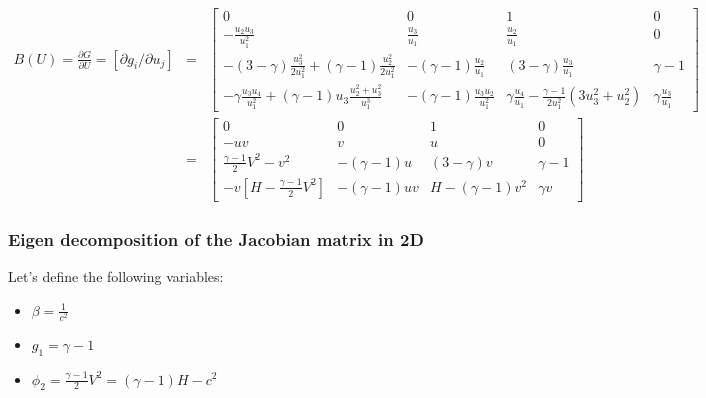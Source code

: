 \documentclass{article}
\begin{document}
\begin{eqnarray}
  B(U) = \frac{\partial G}{\partial U} = \left[ \partial g_i/\partial u_j \right] & = & \left[
    \begin{array}{cccc}
      0 & 0 & 1 & 0\\
      -\frac{u_2 u_3}{u_1^2} & \frac{u_3}{u_1} & \frac{u_2}{u_1} & 0\\
      -(3-\gamma)\frac{u_3^2}{2 u_1^2} + (\gamma-1)\frac{u_2^2}{2 u_1^2} & -(\gamma-1)\frac{u_2}{u_1} & (3-\gamma) \frac{u_3}{u_1} & \gamma-1\\
       -\gamma\frac{u_3 u_4}{u_1^2} + (\gamma-1)u_3 \frac{u_2^2+u_3^2}{u_1^3} & -(\gamma-1)\frac{u_3 u_2}{u_1^2} & \gamma \frac{u_4}{u_1} -\frac{\gamma-1}{2 u_1^2} (3u_3^2+u_2^2) &\gamma \frac{u_3}{u_1}
    \end{array}
  \right]\\
  &=& \left[
    \begin{array}{cccc}
      0 & 0 & 1 & 0\\
      -u v & v & u & 0\\
      \frac{\gamma-1}{2}V^2-v^2 & -(\gamma-1)u  & (3-\gamma) v & \gamma-1\\
      - v [H-\frac{\gamma-1}{2} V^2 ] & -(\gamma-1)uv & H-(\gamma-1)v^2 &\gamma v
    \end{array}
  \right]
\end{eqnarray}

\subsubsection{Eigen decomposition of the Jacobian matrix in 2D}

Let's define the following variables:
\begin{itemize}
\item $\beta = \frac{1}{c^2}$
\item $g_1 = \gamma-1$
\item $\phi_2 = \frac{\gamma-1}{2}V^2 = (\gamma-1) H - c^2$
\end{itemize}
\end{document}
